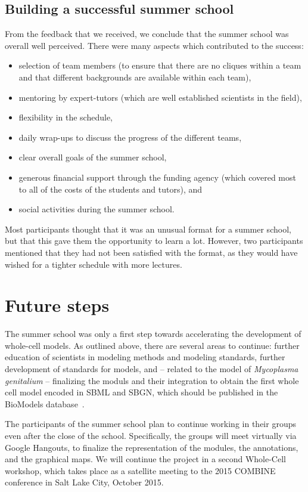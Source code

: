 \documentclass[journal,transmag]{IEEEtran}
\begin{document}
\subsection{Building a successful summer school}
From the feedback that we received, we conclude that the summer school was overall well perceived. 
There were many aspects which contributed to the success: 
\begin{itemize}
\item selection of team members (to ensure that there are no cliques within a team and that different backgrounds are available within each team), 
\item mentoring by expert-tutors (which are well established scientists in the field), 
\item flexibility in the schedule, 
\item daily wrap-ups to discuss the progress of the different teams, 
\item clear overall goals of the summer school,
\item generous financial support through the funding agency (which covered most to all of the costs of the students and tutors), and 
\item social activities during the summer school.
\end{itemize}
Most participants thought that it was an unusual format for a summer school, but that this gave them the opportunity to learn a lot. 
However, two participants mentioned that they had not been satisfied with the format, as they would have wished for a tighter schedule with more lectures. 

\section{Future steps}

The summer school was only a first step towards accelerating the development of whole-cell models. 
As outlined above, there are several areas to continue: further education of scientists in modeling methods and modeling standards, further development of standards for models, and -- related to the model of \textit{Mycoplasma genitalium} -- finalizing the moduls and their integration to obtain the first whole cell model encoded in SBML and SBGN, which should be published in the BioModels database~\cite{li2010biomodels}. 

The participants of the summer school plan to continue working in their groups even after the close of the school. 
Specifically, the groups will meet virtually via Google Hangouts, to finalize the representation of the modules, the annotations, and the graphical maps. 
We will continue the project in a second Whole-Cell workshop, which takes place as a satellite meeting to the 2015 COMBINE conference in Salt Lake City, October 2015.
\end{document}
